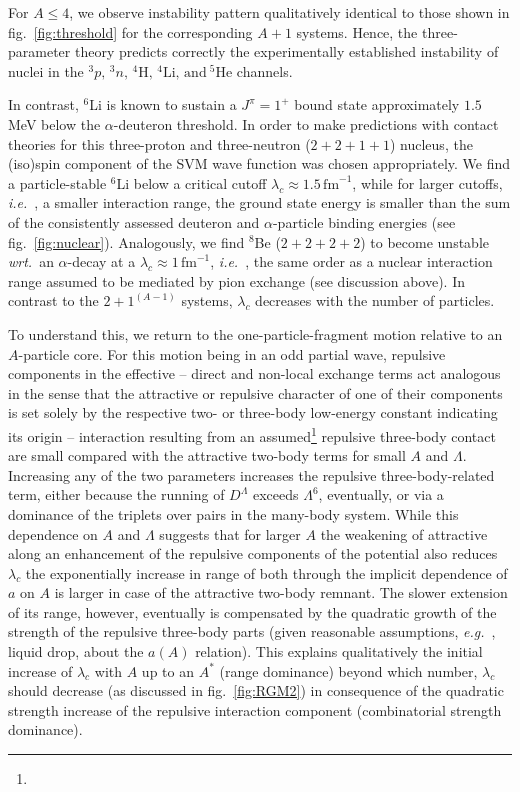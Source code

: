 \documentclass[preprint,12pt]{elsarticle}
\newcommand{\lc}{\ensuremath{\lambda_c}}
\newcommand{\fm}{\ensuremath{\,\text{fm}^{-1}}}
\newcommand{\abb}{\ensuremath{2\!+\!1^{(A-1)}}}
\newcommand{\led}{D^\Lambda}
\newcommand{\wrt}{\textit{wrt.}~}
\newcommand{\eg}{\textit{e.g.}~}
\newcommand{\ie}{\textit{i.e.}~}
\newcommand{\figref}[1]{fig.~\ref{#1}}
\begin{document}
For $A\le 4$, we observe instability pattern qualitatively identical to
those shown in \figref{fig:threshold} for the corresponding $A+1$ systems.
Hence, the three-parameter theory predicts correctly the experimentally
established instability of nuclei in the
$^3p,\,^3n,\,^4\text{H},\,^4\text{Li},\,\text{and}~^5\text{He}$ channels.

In contrast, $^6$Li is known to sustain a $J^\pi=1^+ $ bound state
approximately $1.5~$MeV below the $\alpha$-deuteron threshold.
In order to make predictions with contact theories for this
three-proton and three-neutron ($2+2+1+1$) nucleus, the (iso)spin component of the SVM
wave function was chosen appropriately.
We find a particle-stable $^6$Li below a critical cutoff
$\lc\approx1.5\fm$, while for larger cutoffs,
\ie, a smaller interaction range, the ground state energy is
smaller than the sum of the consistently assessed deuteron and $\alpha$-particle binding
energies (see \figref{fig:nuclear}).
Analogously, we find $^8$Be ($2+2+2+2$) to become unstable \wrt an $\alpha$-decay at a
$\lc\approx 1\fm$, \ie, the same order as a nuclear interaction
range assumed to be mediated by pion exchange (see discussion above).
In contrast to the $\abb$ systems, $\lc$ decreases with the number of particles.

To understand this, we return to the one-particle-fragment motion relative to an $A$-particle core. 
For this motion being in an odd partial wave, repulsive components in
the effective -- direct and non-local exchange terms act analogous in the sense that the attractive
or repulsive character of one of their components is set solely by the respective two- or three-body
low-energy constant indicating its origin -- interaction resulting from an assumed\footnote{} repulsive
three-body contact are small compared with the attractive two-body terms for small $A$ and $\Lambda$.
Increasing any of the two parameters increases the repulsive three-body-related term, either because
the running of $\led$ exceeds $\Lambda^6$, eventually, or via a dominance of the triplets over
pairs in the many-body system.
While this dependence on $A$ and $\Lambda$ suggests that for larger $A$ the weakening of attractive along
an enhancement of the repulsive components of the potential also reduces $\lc$ the exponentially
increase in range of both through the implicit dependence of $a$ on $A$ is larger in case of the
attractive two-body remnant. The slower extension of its range, however, eventually is compensated by
the quadratic growth of the strength of the repulsive three-body parts (given reasonable assumptions, \eg, liquid drop,
about the $a(A)$ relation). 
This explains qualitatively the initial increase of $\lc$ with $A$ up to an $A^*$ (range dominance) beyond which
number, $\lc$ should decrease (as discussed in \figref{fig:RGM2}) in consequence of the quadratic strength
increase of the repulsive interaction component (combinatorial strength dominance).
\end{document}
